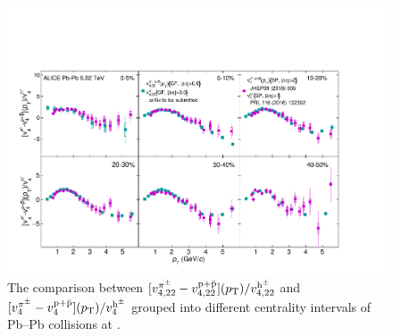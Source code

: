 \documentclass[ALICE,manyauthors]{cernphprep}
\providecommand{\DIFdelend}{} %
\DeclareRobustCommand{\DIFdelend}{\DIFOaddend \let\includegraphics\DIFOincludegraphics} %
\begin{document}
\DIFdelend %


\begin{figure}[!htb]
\begin{center}
\includegraphics[scale=0.6]{figures/results/massOrdering_vn_pion_proton_to_charged.pdf}
\end{center}
\caption{The comparison between $[v_{4,22}^{\pi^{\pm}} -  v_{4,22}^{\rm p+\bar{p}}](p_{\rm T}) / v_{4,22}^{\rm h^{\pm}} $ and $[v_{4}^{\pi^{\pm}} -  v_{4}^{\rm p+\bar{p}}](p_{\rm T}) / v_{4}^{\rm h^{\pm}} $  grouped into different centrality intervals of Pb--Pb collisions at \sNN.}
\label{massOrderingComparison}
\end{figure}


\end{document}
